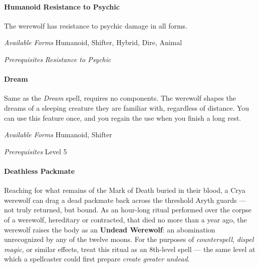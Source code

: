 \documentclass[twocolumn]{dndbook}
\begin{document}
\paragraph*{Humanoid Resistance to Psychic}
The werewolf has resistance to psychic damage in all forms.\par
\emph{Available Forms} Humanoid, Shifter, Hybrid, Dire, Animal\par
\emph{Prerequisites} \emph{Resistance to Psychic}\par

\paragraph*{Dream}
Same as the \emph{Dream} spell, requires no components.
The werewolf shapes the dreams of a sleeping creature they are familiar with, regardless of distance.
You can use this feature once, and you regain the use when you finish a long rest.\par
\emph{Available Forms} Humanoid, Shifter\par
\emph{Prerequisites} Level 5\par

\paragraph*{Deathless Packmate}
Reaching for what remains of the Mark of Death buried in their blood, a Crya werewolf can drag a dead packmate back across the threshold Aryth guards --- not truly returned, but bound.
As an hour-long ritual performed over the corpse of a werewolf, hereditary or contracted, that died no more than a year ago, the werewolf raises the body as an \textbf{Undead Werewolf}: an abomination unrecognized by any of the twelve moons.
For the purposes of \emph{counterspell}, \emph{dispel magic}, or similar effects, treat this ritual as an 8th-level spell --- the same level at which a spellcaster could first prepare \emph{create greater undead}.\par
\end{document}
